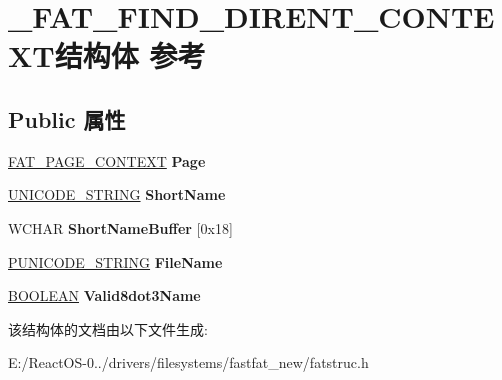 \hypertarget{struct___f_a_t___f_i_n_d___d_i_r_e_n_t___c_o_n_t_e_x_t}{}\section{\+\_\+\+F\+A\+T\+\_\+\+F\+I\+N\+D\+\_\+\+D\+I\+R\+E\+N\+T\+\_\+\+C\+O\+N\+T\+E\+X\+T结构体 参考}
\label{struct___f_a_t___f_i_n_d___d_i_r_e_n_t___c_o_n_t_e_x_t}
\subsection*{Public 属性}
\begin{DoxyCompactItemize}
\item 
\mbox{\label{struct___f_a_t___f_i_n_d___d_i_r_e_n_t___c_o_n_t_e_x_t_a7189c19c929129322d20decb25d3a4d0}} 
\hyperlink{struct___f_a_t___p_a_g_e___c_o_n_t_e_x_t}{F\+A\+T\+\_\+\+P\+A\+G\+E\+\_\+\+C\+O\+N\+T\+E\+XT} {\bfseries Page}
\item 
\mbox{\label{struct___f_a_t___f_i_n_d___d_i_r_e_n_t___c_o_n_t_e_x_t_adafe528d34d67d536036aac5b3e0150b}} 
\hyperlink{struct___u_n_i_c_o_d_e___s_t_r_i_n_g}{U\+N\+I\+C\+O\+D\+E\+\_\+\+S\+T\+R\+I\+NG} {\bfseries Short\+Name}
\item 
\mbox{\label{struct___f_a_t___f_i_n_d___d_i_r_e_n_t___c_o_n_t_e_x_t_aa1ea28240ed326126faa58bae68d9c56}} 
W\+C\+H\+AR {\bfseries Short\+Name\+Buffer} \mbox{[}0x18\mbox{]}
\item 
\mbox{\label{struct___f_a_t___f_i_n_d___d_i_r_e_n_t___c_o_n_t_e_x_t_a397b7966c6bb7f6e009866c6a517e7aa}} 
\hyperlink{struct___u_n_i_c_o_d_e___s_t_r_i_n_g}{P\+U\+N\+I\+C\+O\+D\+E\+\_\+\+S\+T\+R\+I\+NG} {\bfseries File\+Name}
\item 
\mbox{\label{struct___f_a_t___f_i_n_d___d_i_r_e_n_t___c_o_n_t_e_x_t_aa2e4db3da7d25d077e20e785dd963998}} 
\hyperlink{_processor_bind_8h_a112e3146cb38b6ee95e64d85842e380a}{B\+O\+O\+L\+E\+AN} {\bfseries Valid8dot3\+Name}
\end{DoxyCompactItemize}


该结构体的文档由以下文件生成\+:\begin{DoxyCompactItemize}
\item 
E\+:/\+React\+O\+S-\/0../drivers/filesystems/fastfat\+\_\+new/fatstruc.\+h\end{DoxyCompactItemize}
